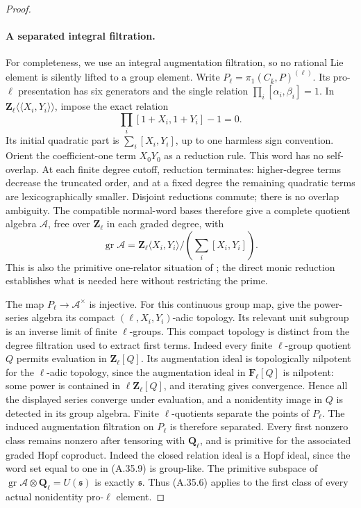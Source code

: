 \begin{proof}
\paragraph{A separated integral filtration.}
For completeness, we use an integral augmentation filtration,
so no rational Lie element is silently lifted to a group
element. Write \(P_\ell=\pi_1(C_{\bar k},P)^{(\ell)}\).
Its pro-\(\ell\) presentation has six generators and the
single relation \(\prod_i[\alpha_i,\beta_i]=1\).
In \(\mathbf Z_\ell\langle\!\langle X_i,Y_i\rangle\!\rangle\),
impose the exact relation
\[
        \prod_i[1+X_i,1+Y_i]-1=0.
                                                        \tag{A.35.9}
\]
Its initial quadratic part is \(\sum_i[X_i,Y_i]\), up to
one harmless sign convention. Orient the coefficient-one
term \(X_0Y_0\) as a reduction rule. This word has no
self-overlap. At each finite degree cutoff, reduction
terminates: higher-degree terms decrease the truncated
order, and at a fixed degree the remaining quadratic
terms are lexicographically smaller. Disjoint reductions
commute; there is no overlap ambiguity. The compatible
normal-word bases therefore give a complete quotient
algebra \(\mathcal A\), free over \(\mathbf Z_\ell\) in
each graded degree, with
\[
 \operatorname{gr}\mathcal A=
 \mathbf Z_\ell\langle X_i,Y_i\rangle/
                       \left(\sum_i[X_i,Y_i]\right).
                                                        \tag{A.35.10}
\]
This is also the primitive one-relator situation of
\cite[Theorem 2 and its corollary, pp.\ 142--143]{fghLabute1967};
the direct monic reduction establishes what is needed here
without restricting the prime.

The map \(P_\ell\to\mathcal A^\times\) is injective.
For this continuous group map, give the power-series algebra
its compact \((\ell,X_i,Y_i)\)-adic topology. Its relevant
unit subgroup is an inverse limit of finite \(\ell\)-groups.
This compact topology is distinct from the degree filtration
used to extract first terms.
Indeed every finite \(\ell\)-group quotient \(Q\) permits
evaluation in \(\mathbf Z_\ell[Q]\). Its augmentation ideal
is topologically nilpotent for the \(\ell\)-adic topology,
since the augmentation ideal in \(\mathbf F_\ell[Q]\) is
nilpotent: some power is contained in
\(\ell\mathbf Z_\ell[Q]\), and iterating gives convergence.
Hence all the displayed series converge under
evaluation, and a nonidentity image in \(Q\) is detected
in its group algebra. Finite \(\ell\)-quotients separate
the points of \(P_\ell\).
The induced augmentation filtration on \(P_\ell\) is
therefore separated. Every first nonzero class remains
nonzero after tensoring with \(\mathbf Q_\ell\), and is
primitive for the associated graded Hopf coproduct.
Indeed the closed relation ideal is a Hopf ideal, since
the word set equal to one in (A.35.9) is group-like.
The primitive subspace of
\(\operatorname{gr}\mathcal A\otimes\mathbf Q_\ell
 =U(\mathfrak s)\) is exactly \(\mathfrak s\).
Thus (A.35.6) applies to the first class of every actual
nonidentity pro-\(\ell\) element.


\end{proof}
